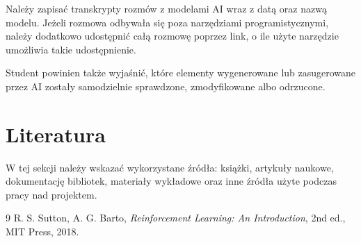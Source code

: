 \documentclass[12pt]{article}
\begin{document}
Należy zapisać transkrypty rozmów z modelami AI wraz z datą oraz nazwą modelu. Jeżeli rozmowa odbywała się poza narzędziami programistycznymi, należy dodatkowo udostępnić całą rozmowę poprzez link, o ile użyte narzędzie umożliwia takie udostępnienie.

Student powinien także wyjaśnić, które elementy wygenerowane lub zasugerowane przez AI zostały samodzielnie sprawdzone, zmodyfikowane albo odrzucone.

\section{Literatura}

W tej sekcji należy wskazać wykorzystane źródła: książki, artykuły naukowe, dokumentację bibliotek, materiały wykładowe oraz inne źródła użyte podczas pracy nad projektem.

\begin{thebibliography}{9}
R. S. Sutton, A. G. Barto, \textit{Reinforcement Learning: An Introduction}, 2nd ed., MIT Press, 2018.
\end{thebibliography}
\end{document}
